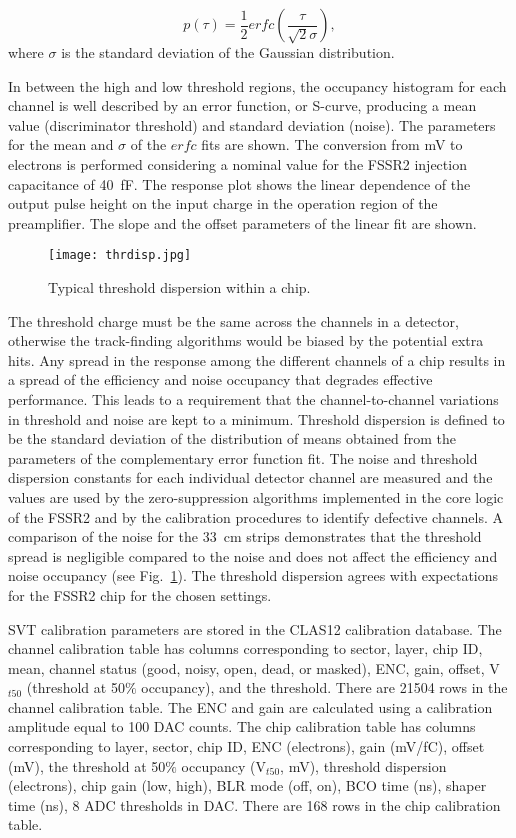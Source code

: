 \begin{equation} p(\tau)=\frac{1}{2} erfc(\frac{\tau}{\sqrt{2}\sigma})  \label{eq:erfc},
\end{equation}
where $\sigma$ is the standard deviation of the Gaussian distribution.

In between the high and low threshold regions, the occupancy histogram for each channel is well described by an error function, or S-curve, producing a mean value (discriminator threshold) and standard deviation (noise). The parameters for the mean and $\sigma$ of the $erfc$ fits are shown. The conversion from mV to electrons is performed considering a nominal value for the FSSR2 injection capacitance of 40~fF. The response plot shows the linear dependence of the output pulse height on the input charge in the operation region of the preamplifier. The slope and the offset parameters of the linear fit are shown. 

\begin{figure}[hbt] 
	\centering 
	\texttt{[image: thrdisp.jpg]}
	\caption{Typical threshold dispersion within a chip.}
	\label{fig:thrdisp}
\end{figure}

The threshold charge must be the same across the channels in a detector, otherwise the track-finding algorithms would be biased by the potential extra hits. Any spread in the response among the different channels of a chip results in a spread of the efficiency and noise occupancy that degrades effective performance. This leads to a requirement that the channel-to-channel variations in threshold and noise are kept to a minimum. Threshold dispersion is defined to be the standard deviation of the distribution of means obtained from the parameters of the complementary error function fit. The noise and threshold dispersion constants for each individual detector channel are measured and the values are used by the zero-suppression algorithms implemented in the core logic of the FSSR2 and by the calibration procedures to identify defective channels. A comparison of the noise for the 33~cm strips demonstrates that the threshold spread is negligible compared to the noise and does not affect the efficiency and noise occupancy (see Fig.~\ref{fig:thrdisp}). The threshold dispersion agrees with expectations for the FSSR2 chip for the chosen settings.

SVT calibration parameters are stored in the CLAS12 calibration database. The channel calibration table has columns corresponding to sector, layer, chip ID, mean, channel status (good, noisy, open, dead, or masked), ENC, gain, offset, V$_{t50}$ (threshold at 50$\%$ occupancy), and the threshold. There are 21504 rows in the channel calibration table. The ENC and gain are calculated using a calibration amplitude equal to 100 DAC counts.
The chip calibration table has columns corresponding to layer, sector, chip ID, ENC (electrons), gain (mV/fC), offset (mV), the threshold at 50$\%$ occupancy (V$_{t50}$, mV), threshold dispersion (electrons), chip gain (low, high), BLR mode (off, on), BCO time (ns), shaper time (ns), 8 ADC thresholds in DAC. There are 168 rows in the chip calibration table. 

